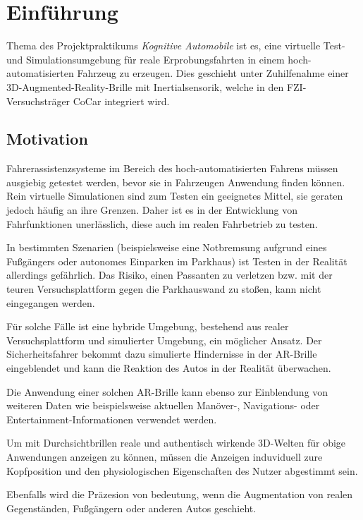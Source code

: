 \section{Einführung}
\label{einleitung_sec}

Thema des Projektpraktikums \emph{Kognitive Automobile} ist es, eine virtuelle Test- und Simulationsumgebung für reale Erprobungsfahrten in einem hoch-automatisierten Fahrzeug zu erzeugen.
Dies geschieht unter Zuhilfenahme einer 3D-Augmented-Reality-Brille mit Inertialsensorik, welche in den \ac{FZI}-Versuchsträger CoCar integriert wird.


\subsection{Motivation}
\label{einleitung_motivation_subsec}
Fahrerassistenzsysteme im Bereich des hoch-automatisierten Fahrens müssen ausgiebig getestet werden, bevor sie in Fahrzeugen Anwendung finden können.
Rein virtuelle Simulationen sind zum Testen ein geeignetes Mittel, sie geraten jedoch häufig an ihre Grenzen.
Daher ist es in der Entwicklung von Fahrfunktionen unerlässlich, diese auch im realen Fahrbetrieb zu testen.

In bestimmten Szenarien (beispielsweise eine Notbremsung aufgrund eines Fußgängers oder autonomes Einparken im Parkhaus) ist Testen in der Realität allerdings gefährlich.
Das Risiko, einen Passanten zu verletzen bzw. mit der teuren Versuchsplattform gegen die Parkhauswand zu stoßen, kann nicht eingegangen werden.

Für solche Fälle ist eine hybride Umgebung, bestehend aus realer Versuchsplattform und simulierter Umgebung, ein möglicher Ansatz.
Der Sicherheitsfahrer bekommt dazu simulierte Hindernisse in der \ac{AR}-Brille eingeblendet und kann die Reaktion des Autos in der Realität überwachen.

Die Anwendung einer solchen \ac{AR}-Brille kann ebenso zur Einblendung von weiteren Daten wie beispielsweise aktuellen Manöver-, Navigations- oder Entertainment-Informationen verwendet werden.


Um mit Durchsichtbrillen reale und authentisch wirkende 3D-Welten für obige Anwendungen anzeigen zu können, müssen die Anzeigen induviduell zure Kopfposition und den physiologischen Eigenschaften des Nutzer abgestimmt sein.

Ebenfalls wird die Präzesion von bedeutung, wenn die Augmentation von realen Gegenständen, Fußgängern oder anderen Autos geschieht.

